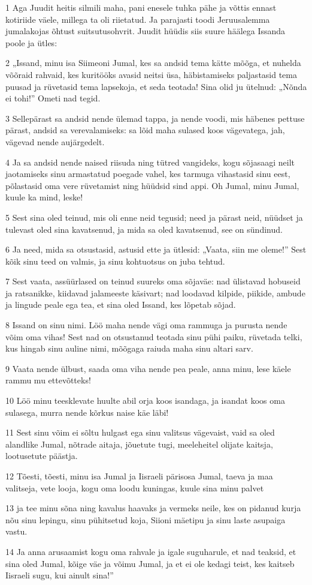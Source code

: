 \par 1 Aga Juudit heitis silmili maha, pani enesele tuhka pähe ja võttis ennast kotiriide väele, millega ta oli riietatud. Ja parajasti toodi Jeruusalemma jumalakojas õhtust suitsutusohvrit. Juudit hüüdis siis suure häälega Issanda poole ja ütles:
\par 2 „Issand, minu isa Siimeoni Jumal, kes sa andsid tema kätte mõõga, et nuhelda võõraid rahvaid, kes kuritööks avasid neitsi üsa, häbistamiseks paljastasid tema puusad ja rüvetasid tema lapsekoja, et seda teotada! Sina olid ju ütelnud: „Nõnda ei tohi!” Ometi nad tegid.
\par 3 Sellepärast sa andsid nende ülemad tappa, ja nende voodi, mis häbenes pettuse pärast, andsid sa verevalamiseks: sa lõid maha sulased koos vägevatega, jah, vägevad nende aujärgedelt.
\par 4 Ja sa andsid nende naised riisuda ning tütred vangideks, kogu sõjasaagi neilt jaotamiseks sinu armastatud poegade vahel, kes tarmuga vihastasid sinu eest, põlastasid oma vere rüvetamist ning hüüdsid sind appi. Oh Jumal, minu Jumal, kuule ka mind, leske!
\par 5 Sest sina oled teinud, mis oli enne neid tegusid; need ja pärast neid, nüüdset ja tulevast oled sina kavatsenud, ja mida sa oled kavatsenud, see on sündinud.
\par 6 Ja need, mida sa otsustasid, astusid ette ja ütlesid: „Vaata, siin me oleme!” Sest kõik sinu teed on valmis, ja sinu kohtuotsus on juba tehtud.
\par 7 Sest vaata, assüürlased on teinud suureks oma sõjaväe: nad ülistavad hobuseid ja ratsanikke, kiidavad jalameeste käsivart; nad loodavad kilpide, piikide, ambude ja lingude peale ega tea, et sina oled Issand, kes lõpetab sõjad.
\par 8 Issand on sinu nimi. Löö maha nende vägi oma rammuga ja purusta nende võim oma vihas! Sest nad on otsustanud teotada sinu pühi paiku, rüvetada telki, kus hingab sinu auline nimi, mõõgaga raiuda maha sinu altari sarv.
\par 9 Vaata nende ülbust, saada oma viha nende pea peale, anna minu, lese käele rammu mu ettevõtteks!
\par 10 Löö minu teesklevate huulte abil orja koos isandaga, ja isandat koos oma sulasega, murra nende kõrkus naise käe läbi!
\par 11 Sest sinu võim ei sõltu hulgast ega sinu valitsus vägevaist, vaid sa oled alandlike Jumal, nõtrade aitaja, jõuetute tugi, meeleheitel olijate kaitsja, lootusetute päästja.
\par 12 Tõesti, tõesti, minu isa Jumal ja Iisraeli pärisosa Jumal, taeva ja maa valitseja, vete looja, kogu oma loodu kuningas, kuule sina minu palvet
\par 13 ja tee minu sõna ning kavalus haavaks ja vermeks neile, kes on pidanud kurja nõu sinu lepingu, sinu pühitsetud koja, Siioni mäetipu ja sinu laste asupaiga vastu.
\par 14 Ja anna arusaamist kogu oma rahvale ja igale suguharule, et nad teaksid, et sina oled Jumal, kõige väe ja võimu Jumal, ja et ei ole kedagi teist, kes kaitseb Iisraeli sugu, kui ainult sina!” 


